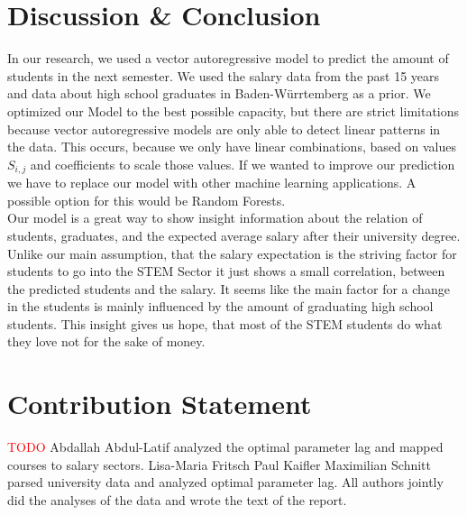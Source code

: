 \documentclass{article}
\theoremstyle{plain}
\theoremstyle{definition}
\theoremstyle{remark}
\begin{document}
\section{Discussion \& Conclusion}\label{sec:conclusion}
In our research, we used a vector autoregressive model to predict the amount of students in the next semester. 
We used the salary data from the past 15 years and data about high school graduates in Baden-Würrtemberg as a prior. We optimized our Model to the best possible capacity,
but there are strict limitations because vector autoregressive models are only able to detect linear patterns in the data. This occurs, because we only have linear combinations,
based on values $S_{i,j}$ and coefficients to scale those values. If we wanted to improve our prediction we have to replace our model with other machine learning applications.
A possible option for this would be Random Forests.\\
Our model is a great way to show insight information about the relation of students, graduates, and the expected average salary after their university degree.
Unlike our main assumption, that the salary expectation is the striving factor for students to go into the STEM Sector it just shows a small correlation,
between the predicted students and the salary. It seems like the main factor for a change in the students is mainly influenced by the amount of graduating high school students.
This insight gives us hope, that most of the STEM students do what they love not for the sake of money.


\section*{Contribution Statement}
\textcolor{red}{TODO}
Abdallah Abdul-Latif analyzed the optimal parameter lag and mapped courses to salary sectors.
Lisa-Maria Fritsch
Paul Kaifler 
Maximilian Schnitt parsed university data and analyzed optimal parameter lag.
All authors jointly did the analyses of the data and wrote the text of the report.


\end{document}
